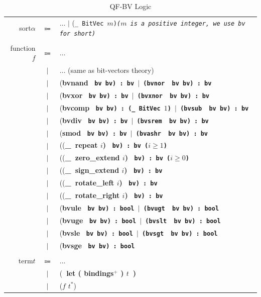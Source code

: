 \documentclass[10pt,letter]{article}
\theoremstyle{definition}
\begin{document}
\begin{table}[!h]
\begin{mdframed}
\centering
\begin{tabular}{r c l}
sort\qquad $\alpha$ & $\Coloneqq$ & $\ldots$ $\mid$ \rm(\tt \_\ BitVec $m$\rm)\it\quad \rm($m$ \rm is a positive integer, we use {\tt bv} for short) \\
\\
function\qquad $f$ & $\Coloneqq$ & $\ldots$ \\
& $\mid$ & $\ldots$ \qquad (same as bit-vectors theory) \\
& $\mid$ & (\bf bvnand \tt\ bv bv\rm) : \tt bv \rm$\mid$ (\bf bvnor \tt\ bv bv\rm) : \tt bv \\
& $\mid$ & (\bf bvxor \tt\ bv bv\rm) : \tt bv \rm$\mid$ (\bf bvxnor \tt\ bv bv\rm) : \tt bv \\
& $\mid$ & (\bf bvcomp \tt\ bv bv\rm) : \rm(\tt \_\ BitVec $1$\rm) $\mid$ (\bf bvsub \tt\ bv bv\rm) : \tt bv \\
& $\mid$ & (\bf bvdiv \tt\ bv bv\rm) : \tt bv \rm$\mid$ (\bf bvsrem \tt\ bv bv\rm) : \tt bv \\
& $\mid$ & (\bf smod \tt\ bv bv\rm) : \tt bv \rm$\mid$ (\bf bvashr \tt\ bv bv\rm) : \tt bv \\
& $\mid$ & ((\bf\_\ repeat $i$\rm) \tt\ bv\rm) : \tt bv \qquad($i \geqslant 1$)\\
& $\mid$ & ((\bf\_\ zero\_extend $i$\rm) \tt\ bv\rm) : \tt bv \qquad($i \geqslant 0$)\\
& $\mid$ & ((\bf\_\ sign\_extend $i$\rm) \tt\ bv\rm) : \tt bv \\
& $\mid$ & ((\bf\_\ rotate\_left $i$\rm) \tt\ bv\rm) : \tt bv \\
& $\mid$ & ((\bf\_\ rotate\_right $i$\rm) \tt\ bv\rm) : \tt bv \\
& $\mid$ & (\bf bvule \tt\ bv bv\rm) : \tt bool \rm$\mid$ (\bf bvugt \tt\ bv bv\rm) : \tt bool \\
& $\mid$ & (\bf bvuge \tt\ bv bv\rm) : \tt bool \rm$\mid$ (\bf bvslt \tt\ bv bv\rm) : \tt bool \\
& $\mid$ & (\bf bvsle \tt\ bv bv\rm) : \tt bool \rm$\mid$ (\bf bvsgt \tt\ bv bv\rm) : \tt bool \\
& $\mid$ & (\bf bvsge \tt\ bv bv\rm) : \tt bool \\
\\
term\qquad $t$ & $\Coloneqq$ & $\ldots$ \\
& $\mid$ & (\bf\ let \rm ( bindings$^+$ ) $t$\ )\\
& $\mid$ & ($f$ $t^*$)\\
\end{tabular}
\end{mdframed}
\caption{QF-BV Logic}
\label{t:qfbvlogic}
\end{table}
\end{document}
